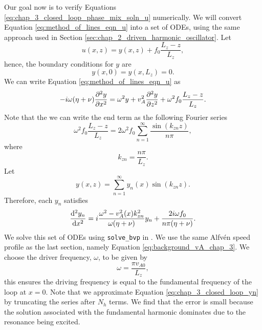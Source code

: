 Our goal now is to verify Equations \eqref{eq:chap_3_closed_loop_phase_mix_soln_u} numerically. 
We will convert Equation \eqref{eq:method_of_lines_eqn_u} into a set of ODEs, using the same approach used in Section \ref{sec:chap_2_driven_harmonic_oscillator}. Let
\begin{equation}
    u(x,z) = y(x,z) + f_0\frac{L_z - z}{L_z},
\end{equation}
hence, the boundary conditions for $y$ are
\begin{equation}
    y(x,0)=y(x,L_z)=0.
\end{equation}
We can write Equation \eqref{eq:method_of_lines_eqn_u} as
\[
-i\omega(\eta+\nu)\pdv[2]{y}{x}=\omega^2 y + v_A^2 \pdv[2]{y}{z} + \omega^2f_0\frac{L_z - z}{L_z}.
\]
Note that the we can write the end term as the following Fourier series
\[\omega^2f_0\frac{L_z - z}{L_z} = 2\omega^2f_0\sum_{n=1}^\infty\frac{\sin(k_{zn}z)}{n\pi},\]
where
\begin{equation}
    k_{zn} = \frac{n\pi}{L_z}.
\end{equation}
Let
\begin{equation}
    \label{eq:chap_3_closed_loop_yn}
    y(x,z) = \sum_{n=1}^\infty y_n(x)\sin(k_{zn} z).
\end{equation}
Therefore, each $y_n$ satisfies
\begin{equation}
    \dv[2]{y_n}{x}=i\frac{\omega^2 - v_A^2(x)k_{zn}^2}{\omega(\eta+\nu)}y_n + \frac{2i\omega f_0}{n\pi(\eta+\nu)}.
\end{equation}
We solve this set of ODEs using \texttt{solve\_bvp} in \citet{SciPy2020}. We use the same Alfv\'en speed profile as the last section, namely Equation \eqref{eq:background_vA_chap_3}. We choose the driver frequency, $\omega$, to be given by
 \begin{equation}
     \omega = \frac{\pi v_{A0}}{L_z},
 \end{equation}
 this ensures the driving frequency is equal to the fundamental frequency of the loop at $x=0$.
 Note that we approximate Equation \eqref{eq:chap_3_closed_loop_yn} by truncating the series after $N_h$ terms. We find that the error is small because the solution associated with the fundamental harmonic dominates due to the resonance being excited.
 
